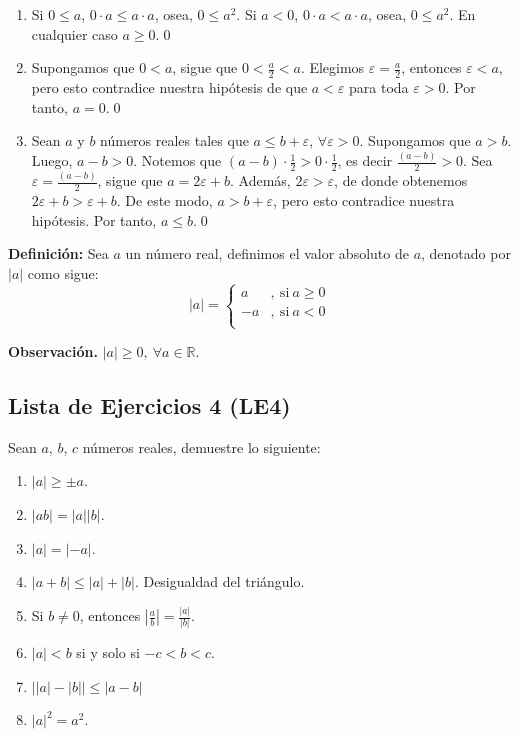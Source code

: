 \documentclass[11pt]{article}
\newcommand{\R}{\mathbb{R}}
\begin{document}
\begin{enumerate}[label=\alph*)]
    \item Si $0 \leq a$, $ 0\cdot a \leq a \cdot a$, osea, $0 \leq a^2$. Si $a<0$, $0\cdot a < a \cdot a$, osea, $0 \leq a^2$. En cualquier caso $a\geq0$.\qed
    \item Supongamos que $0<a$, sigue que $0<\frac{a}{2}<a$. Elegimos $\varepsilon=\frac{a}{2}$, entonces $\varepsilon<a$, pero esto contradice nuestra hipótesis de que $a< \varepsilon$ para toda $\varepsilon>0$. Por tanto, $a=0$.\qed
    \item Sean $a$ y $b$ números reales tales que $a \leq b + \varepsilon$, $\forall \varepsilon > 0$. Supongamos que $a > b$. Luego, $a-b>0$. Notemos que $(a-b) \cdot \frac{1}{2} > 0 \cdot \frac{1}{2}$, es decir $\frac{(a-b)}{2} > 0$. Sea $\varepsilon = \frac{(a-b)}{2}$, sigue que $a=2\varepsilon+b$. Además, $2\varepsilon > \varepsilon$, de donde obtenemos $2 \varepsilon + b > \varepsilon + b$. De este modo, $a > b+\varepsilon$, pero esto contradice nuestra hipótesis. Por tanto, $a \leq b$.\qed

\end{enumerate}

\textbf{Definición:} Sea $a$ un número real, definimos el valor absoluto de $a$, denotado por $|a|$ como sigue: 
    \[
    |a| = 
    \left \{
        \begin{aligned}
        a &,\ \text{si} \ a \geq 0\\
        -a &,\ \text{si} \ a < 0 \\
        \end{aligned}
    \right .
    \]

\textbf{Observación.} $|a|\geq 0, \ \forall a\in \R$.

\subsection*{Lista de Ejercicios 4 (LE4)}

Sean $a$, $b$, $c$ números reales, demuestre lo siguiente:

\begin{enumerate}[label=\alph*)]
    \item $|a| \geq \pm a$. %
    \item $|ab|=|a||b|$. %
    \item $|a|=|-a|$. %
    \item $|a+b|\leq |a|+|b|$. Desigualdad del triángulo. %
    \item Si $b\neq 0$, entonces $\left| \frac{a}{b} \right| = \frac{|a|}{|b|}$. %
    \item $|a|<b$ si y solo si $-c<b<c$. %
    \item $ \big| |a|-|b| \big| \leq |a-b|$ %
    \item $|a|^2=a^2$.
\end{enumerate}
\end{document}
